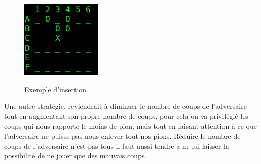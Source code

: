 \documentclass[10pt, a4paper]{article}
\begin{document}
\begin {figure}[H]
  \centering
  \includegraphics [scale = 0.5]{images/Insertion.png}
  \label {exemple_insertion}
  \caption {Exemple d'insertion}
\end {figure}

Une autre stratégie, reviendrait à diminuer le nombre de coups de l'adversaire tout en augmentant son propre nombre de coups, pour cela on va privilégié les coups qui nous rapporte le moins de pion, mais tout en faisant attention à ce que l'adversaire ne puisse pas nous enlever tout nos pions. Réduire le nombre de coups de l'adversaire n'est pas tous il faut aussi tendre a ne lui laisser la possibilité de ne jouer que des mauvais coups.
\end{document}
